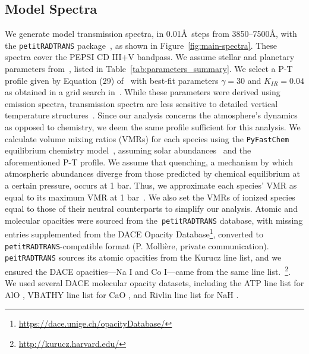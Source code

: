 \documentclass[twocolumn]{aastex631}
\newcommand{\code}[1]{\texttt{#1}}
\begin{document}
        \subsection{Model Spectra}\label{subsec:Model Spectra}
            We generate model transmission spectra, in 0.01\AA\ steps from 3850--7500\AA, with the \code{petitRADTRANS} package~\citep{petitRADTRANS}, as shown in Figure~\ref{fig:main-spectra}. These spectra cover the PEPSI CD III+V bandpass. We assume stellar and planetary parameters from~\citet{Lund2017}, listed in Table~\ref{tab:parameters_summary}. We select a P-T profile given by Equation (29) of~\citet{Guillot2010} with best-fit parameters $\gamma = 30$ and $K_{IR} = 0.04$ as obtained in a grid search in~\citet{Johnson2023}. While these parameters were derived using emission spectra, transmission spectra are less sensitive to detailed vertical temperature structures~\citep{Snellen2010, Kesseli2020}. Since our analysis concerns the atmosphere's dynamics as opposed to chemistry, we deem the same profile sufficient for this analysis. 
            We calculate volume mixing ratios (VMRs) for each species using the \code{PyFastChem} equilibrium chemistry model~\citep{Stock2018, Stock2022, Kitzmann2023}, assuming solar abundances~\citep{Asplund2021} and the aforementioned P-T profile. We assume that quenching, a mechanism by which atmospheric abundances diverge from those predicted by chemical equilibrium at a certain pressure, occurs at 1 bar. Thus, we approximate each species' VMR as equal to its maximum VMR at 1 bar~\citep{Johnson2023,Petz2023}. We also set the VMRs of ionized species equal to those of their neutral counterparts to simplify our analysis. 
            Atomic and molecular opacities were sourced from the~\code{petitRADTRANS} database, with missing entries supplemented from the DACE Opacity Database\footnote{\url{https://dace.unige.ch/opacityDatabase/}}, converted to \code{petitRADTRANS}-compatible format (P. Mollière, private communication). \code{peitRADTRANS} sources its atomic opacities from the Kurucz line list, and we ensured the DACE opacities---Na I and Co I---came from the same line list.~\footnote{\url{http://kurucz.harvard.edu/}}. We used several DACE molecular opacity datasets, including the ATP line list for AlO \citep{ATP}, VBATHY line list for CaO \citep{VBATHY}, and Rivlin line list for NaH \citep{Rivlin}.
            
\end{document}
